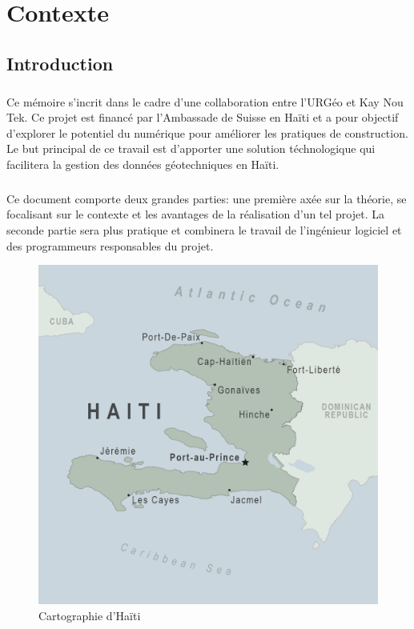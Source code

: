 \chapter{Contexte}
\section{Introduction}
    \paragraph{}
    Ce mémoire s'incrit dans le cadre d'une collaboration entre
    l'URGéo et Kay Nou Tek. Ce projet est financé par l’Ambassade
    de Suisse en Haïti et a pour objectif d’explorer le potentiel 
    du numérique pour améliorer les pratiques de construction.
    Le but principal de ce travail est
    d'apporter une solution téchnologique  qui facilitera la 
    gestion des données géotechniques en Haïti.
    \paragraph{}
    Ce document comporte deux grandes parties: une première axée
    sur la théorie, se focalisant sur le contexte et les avantages
    de la réalisation d'un tel projet. La seconde partie sera plus pratique
    et combinera le travail de l'ingénieur logiciel et des programmeurs responsables
    du projet.
    \begin{figure}
        \centering
        \includegraphics[width=1\textwidth]{map-haiti.png}
        \caption{Cartographie d'Haïti}
    \end{figure}
